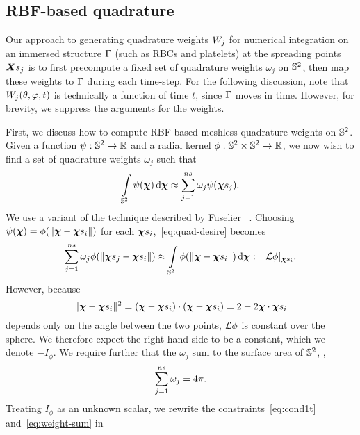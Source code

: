 \subsection{RBF-based quadrature}\label{sec:rbf-quadrature}

Our approach to generating quadrature weights $\weight[j]$ for numerical integration on an immersed structure
$\Gamma$ (such as RBCs and platelets) at the spreading points $\Xsj$ is to first precompute a fixed set of
quadrature weights $\omega_j$ on $\mathbb{S}^2$, then map these weights to $\Gamma$ during each time-step. For the
following discussion, note that $\weight[j](\theta, \varphi, t)$ is technically a function of time $t$, since
$\Gamma$ moves in time. However, for brevity, we suppress the arguments for the weights.

First, we discuss how to compute RBF-based meshless quadrature weights on $\mathbb{S}^2$. Given a function
$\psi:\mathbb{S}^2\to\mathbb{R}$ and a radial kernel $\phi:\mathbb{S}^2\times\mathbb{S}^2\to\mathbb{R}$, we now wish to find a set of quadrature
weights $\omega_j$ such that
\begin{equation}\label{eq:quad-desire}
    \int\limits_{\sphere} \psi(\Xp) \d\Xp \approx \sum_{j=1}^{\sample\cardinality} \omega_j \psi(\Xpsj).
\end{equation}
We use a variant of the technique described by Fuselier ~\cite{Fuselier:2013coba}.  Choosing
$\psi(\Xp) = \phi(\|\Xp-\sample\Xp_i\|)$ for each $\sample\Xp_i$,~\eqref{eq:quad-desire} becomes
\begin{equation}
    \sum_{j=1}^{\sample\cardinality} \omega_j \phi(\|\Xpsj-\sample\Xp_i\|)
    \approx \int\limits_{\sphere}\phi(\|\Xp-\sample\Xp_i\|) \d\Xp := \L\phi|_{\sample\Xp_i}.
    \label{eq:cond1t}
\end{equation}
However, because
\begin{equation}
    \|\Xp-\sample\Xp_i\|^2
        = (\Xp-\sample\Xp_i)\cdot(\Xp-\sample\Xp_i)
        = 2 - 2\Xp\cdot\sample\Xp_i
\end{equation}
depends only on the angle between the two points, $\mathcal{L}\phi$ is constant over the sphere. We therefore expect the
right-hand side to be a constant, which we denote $-I_\phi$. We require further that the $\omega_j$ sum to the
surface area of $\mathbb{S}^2$, ,
\begin{equation}\label{eq:weight-sum}
    \sum_{j=1}^{\sample\cardinality} \omega_j  = 4\pi.
\end{equation}
Treating $I_\phi$ as an unknown scalar, we rewrite the constraints~\eqref{eq:cond1t} and~\eqref{eq:weight-sum} in
